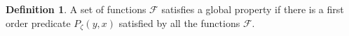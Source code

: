 \documentclass[a4paper,11pt]{article}
\newtheorem{theorem}{Theorem}[section]
\theoremstyle{definition}
\newtheorem{definition}[theorem]{Definition}
\theoremstyle{remark}
\begin{document}
	\begin{definition}
		A set of functions $\mathcal{F}$ satisfies a global property if there is a first order predicate $P_{\zeta}(y,x)$ satisfied by all the functions $\mathcal{F}$.%
	\end{definition}
	
	
	
\end{document}
